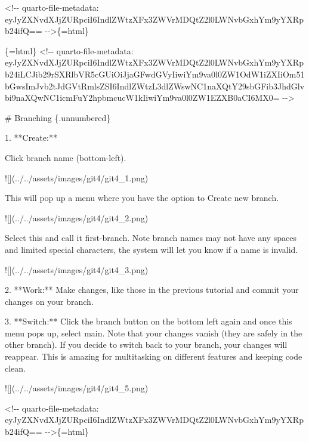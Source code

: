 \documentclass[
  letterpaper,
  DIV=11,
  numbers=noendperiod,
  oneside]{scrreprt}
\newenvironment{Shaded}{\begin{snugshade}}{\end{snugshade}}
\newcommand{\AlertTok}[1]{\textcolor[rgb]{0.68,0.00,0.00}{#1}}
\newcommand{\FunctionTok}[1]{\textcolor[rgb]{0.28,0.35,0.67}{#1}}
\newcommand{\InformationTok}[1]{\textcolor[rgb]{0.37,0.37,0.37}{#1}}
\newcommand{\NormalTok}[1]{\textcolor[rgb]{0.00,0.23,0.31}{#1}}
\newcommand{\SpecialStringTok}[1]{\textcolor[rgb]{0.13,0.47,0.30}{#1}}
\begin{document}
\begin{Shaded}
\begin{Highlighting}[numbers=left,,]
\InformationTok{\textasciigrave{}\textless{}!{-}{-} quarto{-}file{-}metadata: eyJyZXNvdXJjZURpciI6IndlZWtzXFx3ZWVrMDQtZ2l0LWNvbGxhYm9yYXRpb24ifQ== {-}{-}\textgreater{}\textasciigrave{}}\NormalTok{\{=html\}}

\InformationTok{\textasciigrave{}\textasciigrave{}\textasciigrave{}\{=html\}}
\InformationTok{\textless{}!{-}{-} quarto{-}file{-}metadata: eyJyZXNvdXJjZURpciI6IndlZWtzXFx3ZWVrMDQtZ2l0LWNvbGxhYm9yYXRpb24iLCJib29rSXRlbVR5cGUiOiJjaGFwdGVyIiwiYm9va0l0ZW1OdW1iZXIiOm51bGwsImJvb2tJdGVtRmlsZSI6IndlZWtzL3dlZWswNC1naXQtY29sbGFib3JhdGlvbi9naXQwNC1icmFuY2hpbmcucW1kIiwiYm9va0l0ZW1EZXB0aCI6MX0= {-}{-}\textgreater{}}
\InformationTok{\textasciigrave{}\textasciigrave{}\textasciigrave{}}

\FunctionTok{\# Branching \{.unnumbered\}}


\SpecialStringTok{1.  }\NormalTok{**Create:**}

\NormalTok{Click branch name (bottom{-}left).}

\AlertTok{![](../../assets/images/git4/git4\_1.png)}

\NormalTok{This will pop up a menu where you have the option to }\InformationTok{\textasciigrave{}Create new branch\textasciigrave{}}\NormalTok{.}

\AlertTok{![](../../assets/images/git4/git4\_2.png)}

\NormalTok{Select this and call it first{-}branch. Note branch names may not have any spaces and limited special characters, the system will let you know if a name is invalid.}

\AlertTok{![](../../assets/images/git4/git4\_3.png)}

\SpecialStringTok{2.  }\NormalTok{**Work:** Make changes, like those in the previous tutorial and commit your changes on your branch.}

\SpecialStringTok{3.  }\NormalTok{**Switch:** Click the branch button on the bottom left again and once this menu pops up, select }\InformationTok{\textasciigrave{}main\textasciigrave{}}\NormalTok{. Note that your changes vanish (they are safely in the other branch). If you decide to switch back to your branch, your changes will reappear. This is amazing for multitasking on different features and keeping code clean.}

    \AlertTok{![](../../assets/images/git4/git4\_5.png)}


\InformationTok{\textasciigrave{}\textless{}!{-}{-} quarto{-}file{-}metadata: eyJyZXNvdXJjZURpciI6IndlZWtzXFx3ZWVrMDQtZ2l0LWNvbGxhYm9yYXRpb24ifQ== {-}{-}\textgreater{}\textasciigrave{}}\NormalTok{\{=html\}}


\end{Highlighting}
\end{Shaded}
\end{document}
